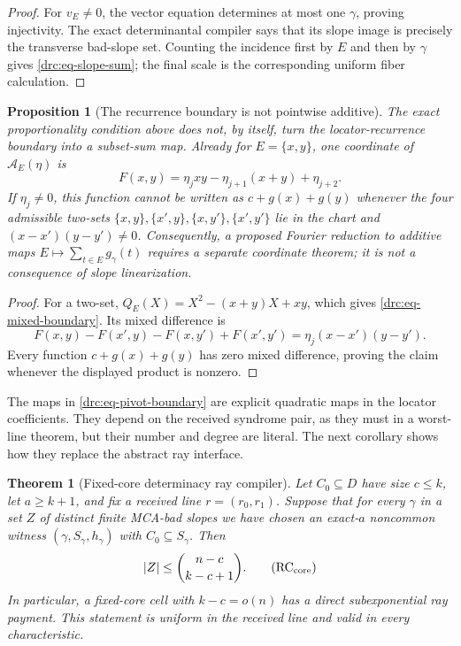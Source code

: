 \documentclass[11pt,a4paper]{amsart}
\numberwithin{equation}{section}
\newtheorem{theorem}{Theorem}[section]
\newtheorem{proposition}[proposition]{Proposition}
\theoremstyle{remark}
\newcommand{\abs}[1]{\lvert #1\rvert}
\begin{document}
\begin{proof}
For \(v_E\ne0\), the vector equation determines at most one
\(\gamma\), proving injectivity.  The exact determinantal compiler says
that its slope image is precisely the transverse bad-slope set.  Counting
the incidence first by \(E\) and then by \(\gamma\) gives
\eqref{drc:eq-slope-sum}; the final scale is the corresponding uniform
fiber calculation.
\end{proof}

\begin{proposition}[The recurrence boundary is not pointwise additive]
\label{drc:prop-recurrence-nonadditive}
The exact proportionality condition above does not, by itself, turn the
locator-recurrence boundary into a subset-sum map.  Already for
\(E=\{x,y\}\), one coordinate of \(\mathcal A_E(\eta)\) is
\[
 F(x,y)=\eta_jxy-\eta_{j+1}(x+y)+\eta_{j+2}.       \tag{DRC3}
\label{drc:eq-mixed-boundary}
\]
If \(\eta_j\ne0\), this function cannot be written as
\(c+g(x)+g(y)\) whenever the four admissible two-sets
\(\{x,y\},\{x',y\},\{x,y'\},\{x',y'\}\) lie in the chart and
\((x-x')(y-y')\ne0\).
Consequently, a proposed Fourier reduction to additive maps
\(E\mapsto\sum_{t\in E}g_\gamma(t)\) requires a separate coordinate
theorem; it is not a consequence of slope linearization.
\end{proposition}

\begin{proof}
For a two-set,
\(Q_E(X)=X^2-(x+y)X+xy\), which gives
\eqref{drc:eq-mixed-boundary}.  Its mixed difference is
\[
 F(x,y)-F(x',y)-F(x,y')+F(x',y')
   =\eta_j(x-x')(y-y').
\]
Every function \(c+g(x)+g(y)\) has zero mixed difference, proving the
claim whenever the displayed product is nonzero.
\end{proof}

The maps in \eqref{drc:eq-pivot-boundary} are explicit quadratic maps in
the locator coefficients.  They depend on the received syndrome pair, as
they must in a worst-line theorem, but their number and degree are literal.
The next corollary shows how they replace the abstract ray interface.


\begin{theorem}[Fixed-core determinacy ray compiler]
\label{thm:fixed-core-determinacy-ray}
Let \(C_0\subseteq D\) have size \(c\le k\), let \(a\ge k+1\), and
fix a received line \(r=(r_0,r_1)\).  Suppose that for every
\(\gamma\) in a set \(Z\) of distinct finite MCA-bad slopes we have
chosen an exact-\(a\) noncommon witness
\((\gamma,S_\gamma,h_\gamma)\) with \(C_0\subseteq S_\gamma\).  Then
\[
             \abs Z\le \binom{n-c}{k-c+1}.          \tag{RC$_{\rm core}$}
\]
In particular, a fixed-core cell with \(k-c=o(n)\) has a direct
subexponential ray payment.  This statement is uniform in the received
line and valid in every characteristic.
\end{theorem}
\end{document}
